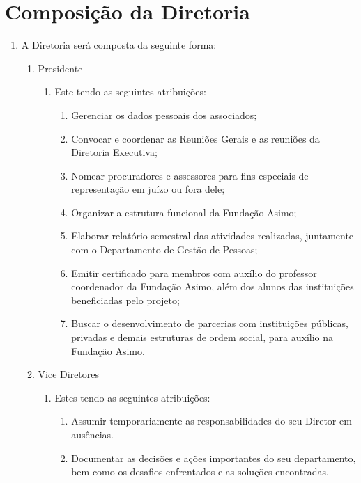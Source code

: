     \section{Composição da Diretoria}
    \begin{enumerate}
       \item A Diretoria será composta da seguinte forma:
       \begin{enumerate}
           \item Presidente
           \begin{enumerate}
               \item Este tendo as seguintes atribuições:
               \begin{enumerate}
               \item  Gerenciar os dados pessoais dos associados;
               \item  Convocar e coordenar as Reuniões Gerais e as reuniões da Diretoria Executiva;
               \item  Nomear procuradores e assessores para fins especiais de representação em juízo ou fora dele;
               \item  Organizar a estrutura funcional da Fundação Asimo;
               \item  Elaborar relatório semestral das atividades realizadas, juntamente com o Departamento de Gestão de Pessoas;
               \item  Emitir certificado para membros com auxílio do professor coordenador da Fundação Asimo, além dos alunos das instituições beneficiadas pelo projeto;
               \item  Buscar o desenvolvimento de parcerias com instituições públicas, privadas e demais estruturas de ordem social, para auxílio na Fundação Asimo.
               \end{enumerate}
           \end{enumerate}
            \item Vice Diretores
                \begin{enumerate}
                    \item Estes tendo as seguintes atribuições:
                    \begin{enumerate}
                        \item Assumir temporariamente as responsabilidades do seu Diretor em ausências.
                        \item Documentar as decisões e ações importantes do seu departamento, bem como os desafios enfrentados e as soluções encontradas.
                    \end{enumerate}
                \end{enumerate}              
           

\end{enumerate}
\end{enumerate}
